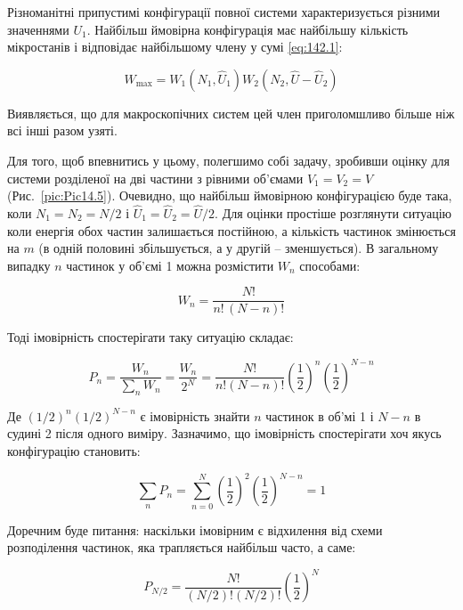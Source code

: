 Різноманітні припустимі конфігурації повної системи характеризується різними значеннями $U_1$. Найбільш ймовірна конфігурація має найбільшу кількість мікростанів і відповідає найбільшому члену у сумі \eqref{eq:142.1}:

\begin{equation}
	W_{\max} = W_1(N_1, \hat{U}_1) W_2(N_2, \hat{U} - \hat{U}_2)
	\label{eq:142.2}
\end{equation}

Виявляється, що для макроскопічних систем цей член приголомшливо більше ніж всі інші разом узяті.

Для того, щоб впевнитись у цьому, полегшимо собі задачу, зробивши оцінку для системи розділеної на дві частини з рівними об’ємами $V_1 = V_2 = V$ (Рис.~\ref{pic:Pic14.5}). Очевидно, що найбільш ймовірною конфігурацією буде така, коли $N_1 = N_2 = N/2$ і $\hat{U}_1 = \hat{U}_2 = \hat{U}/2$. Для оцінки простіше розглянути ситуацію коли енергія обох частин залишається постійною, а кількість частинок змінюється на $m$ (в одній половині збільшується, а у другій – зменшується). В загальному випадку $n$ частинок у об’ємі 1 можна розмістити $W_n$ способами:

\begin{equation}
	W_n = \frac{N!}{n! \, (N - n)!}
	\label{eq:142.3}
\end{equation}

Тоді імовірність спостерігати таку ситуацію складає:

\begin{equation}
	P_n = \frac{W_n}{\sum_n W_n} = \frac{W_n}{2^N} = \frac{N!}{n!\left(N-n\right)!}\left(\frac{1}{2}\right)^n\left(\frac{1}{2}\right)^{N-n}
	\label{eq:142.4}
\end{equation}

Де $(1/2)^n (1/2)^{N - n}$ є імовірність знайти $n$ частинок в об’мі 1 і $N - n$ в судині 2 після одного виміру. Зазначимо, що імовірність спостерігати хоч якусь конфігурацію становить:

\begin{equation}
	\sum_n P_n = \sum_{n=0}^N \left(\frac12\right)^2\left(\frac12\right)^{N - n} = 1
	\label{eq:142.5}
\end{equation}

Доречним буде питання: наскільки імовірним є відхилення від схеми розподілення частинок, яка трапляється найбільш часто, а саме:

\begin{equation}
	P_{N/2} = \frac{N!}{(N/2)! (N/2)!}\left(\frac12\right)^N
	\label{eq:142.6}
\end{equation}

